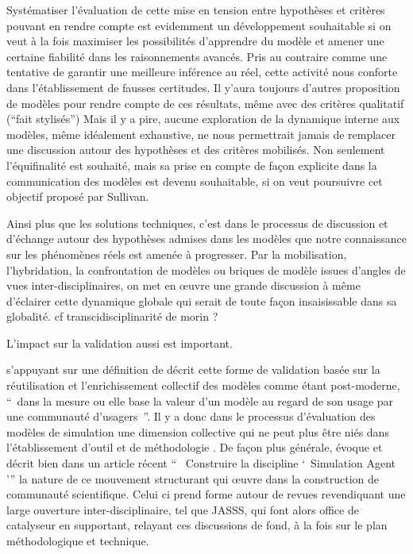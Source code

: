 Systématiser l'évaluation de cette mise en tension entre hypothèses et critères pouvant en rendre compte est evidemment un développement souhaitable si on veut à la fois maximiser les possibilités d'apprendre du modèle et amener une certaine fiabilité dans les raisonnements avancés. Pris au contraire comme une tentative de garantir une meilleure inférence au réel, cette activité nous conforte dans l'établissement de fausses certitudes. Il y'aura toujours d'autres proposition de modèles pour rendre compte de ces résultats, même avec des critères qualitatif (\enquote{fait stylisés})
Mais il y a pire, aucune exploration de la dynamique interne aux modèles, même idéalement exhaustive, ne nous permettrait jamais de remplacer une discussion autour des hypothèses et des critères mobilisés. Non seulement l'équifinalité est souhaité, mais sa prise en compte de façon explicite dans la communication des modèles est devenu souhaitable, si on veut poursuivre cet objectif proposé par Sullivan. 



Ainsi plus que les solutions techniques, c'est dans le processus de discussion et d'échange autour des hypothèses admises dans les modèles que notre connaissance sur les phénomènes réels est amenée à progresser. Par la mobilisation, l'hybridation, la confrontation de modèles ou briques de modèle issues d'angles de vues inter-disciplinaires,  on met en œuvre une grande discussion à même d'éclairer cette dynamique globale qui serait de toute façon insaisissable dans sa globalité. {cf transcidisciplinarité de morin ?}


L'impact sur la validation aussi est important.

\autocite{Rouchier2013, Ahrweiler2005}

\autocite{Rouchier2013} s'appuyant sur une définition de  décrit cette forme de validation basée sur la réutilisation et l'enrichissement collectif des modèles comme étant post-moderne, \enquote{ dans la mesure ou elle base la valeur d'un modèle au regard de son usage par une communauté d'usagers }. Il y a donc dans le processus d'évaluation des modèles de simulation une dimension collective qui ne peut plus être niés dans l'établissement d'outil et de méthodologie . De façon plus générale, \autocite{Rouchier2013} évoque et décrit bien dans un article récent \enquote{  Construire la discipline \enquote{ Simulation Agent }} la nature de ce mouvement structurant qui œuvre dans la construction de communauté scientifique. Celui ci prend forme autour de revues revendiquant une large ouverture inter-disciplinaire, tel que JASSS, qui font alors office de catalyseur en supportant, relayant ces discussions de fond, à la fois sur le plan méthodologique et technique.

